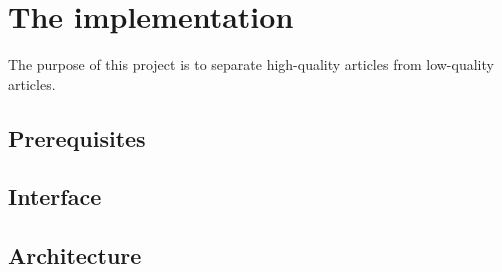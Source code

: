 \section{The implementation}
The purpose of this project is to separate high-quality articles from
low-quality articles.

\subsection{Prerequisites}


\subsection{Interface}


\subsection{Architecture}

